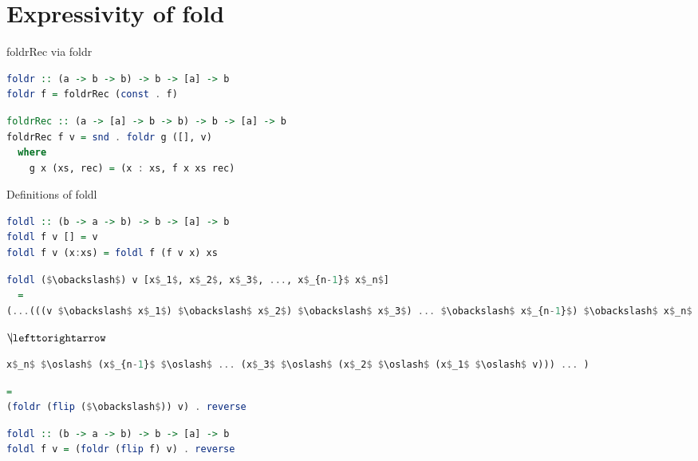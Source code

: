 \documentclass[lualatex]{beamer}
\renewcommand{\_}{\textscale{.6}{\textunderscore}}
\begin{document}
\section{Expressivity of fold}

\begin{frame}[fragile]{foldrRec via foldr}
\begin{lstlisting}[language=Haskell, morekeywords={foldr,foldrRec}]
foldr :: (a -> b -> b) -> b -> [a] -> b
foldr f = foldrRec (const . f)
\end{lstlisting}
\vspace{15mm}
\pause
\begin{lstlisting}[language=Haskell, morekeywords={foldr,foldrRec}]
foldrRec :: (a -> [a] -> b -> b) -> b -> [a] -> b
foldrRec f v = snd . foldr g ([], v)
  where
    g x (xs, rec) = (x : xs, f x xs rec)
\end{lstlisting}
\end{frame}

\begin{frame}[fragile]{Definitions of foldl}
\begin{lstlisting}[language=Haskell, morekeywords={foldr,foldl}]
foldl :: (b -> a -> b) -> b -> [a] -> b
foldl f v [] = v
foldl f v (x:xs) = foldl f (f v x) xs
\end{lstlisting}
\pause
\begin{lstlisting}[language=Haskell, morekeywords={foldr}]
foldl ($\obackslash$) v [x$_1$, x$_2$, x$_3$, ..., x$_{n-1}$ x$_n$]
  =
(...(((v $\obackslash$ x$_1$) $\obackslash$ x$_2$) $\obackslash$ x$_3$) ... $\obackslash$ x$_{n-1}$) $\obackslash$ x$_n$
\end{lstlisting}
\pause
\hspace{4mm}$\mathrlap{\lefttorightarrow}\mid$
\begin{lstlisting}[language=Haskell, morekeywords={foldr}]
x$_n$ $\oslash$ (x$_{n-1}$ $\oslash$ ... (x$_3$ $\oslash$ (x$_2$ $\oslash$ (x$_1$ $\oslash$ v))) ... )
\end{lstlisting}
\pause
\begin{lstlisting}[language=Haskell, morekeywords={foldr}]
  =
(foldr (flip ($\obackslash$)) v) . reverse
\end{lstlisting}
\pause
\begin{lstlisting}[language=Haskell, morekeywords={foldr,foldl}]
foldl :: (b -> a -> b) -> b -> [a] -> b
foldl f v = (foldr (flip f) v) . reverse
\end{lstlisting}
\end{frame}
\end{document}

